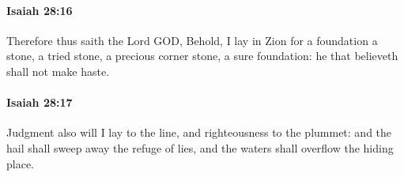 		\paragraph{Isaiah 28:16} %
			\label{ISAIAH-28-16}

			Therefore thus saith the Lord GOD, Behold, I lay in Zion for a foundation a stone, a tried stone, a precious corner stone, a sure foundation: he that believeth shall not make haste.


		\paragraph{Isaiah 28:17} %
			\label{ISAIAH-28-17}

			Judgment also will I lay to the line, and righteousness to the plummet: and the hail shall sweep away the refuge of lies, and the waters shall overflow the hiding place.


